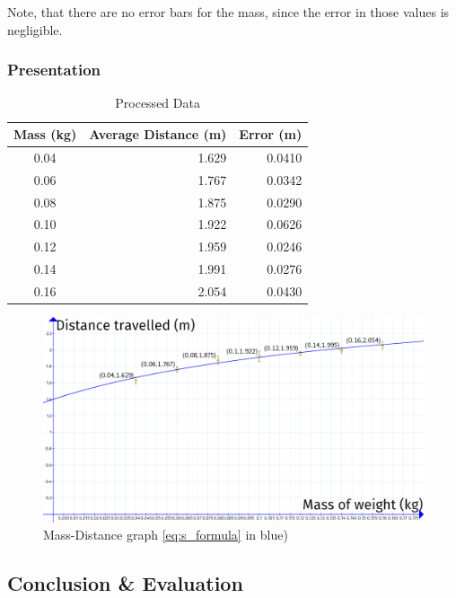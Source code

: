 \documentclass[titlepage,12pt]{article}
\let\oldsubsection\subsection
\renewcommand\subsection{\FloatBarrier \oldsubsection}
\begin{document}
Note, that there are no error bars for the mass, since the error in those values is
negligible.

\subsubsection{Presentation}

\begin{table}[H]
    \centering
    \def\arraystretch{1.5}
    \begin{tabular}{c||r|r}
        Mass (kg) & Average Distance (m) & Error (m)\\ 
        \hline
        \hline
        0.04 & 1.629 & 0.0410\\ 
        \hline
        0.06 & 1.767 & 0.0342\\ 
        \hline
        0.08 & 1.875 & 0.0290\\ 
        \hline
        0.10 & 1.922 & 0.0626\\ 
        \hline
        0.12 & 1.959 & 0.0246\\ 
        \hline
        0.14 & 1.991 & 0.0276\\ 
        \hline
        0.16 & 2.054 & 0.0430\\ 
    \end{tabular}
    \caption{Processed Data} 
    \label{table:processed data}
\end{table}

\begin{figure}[H]
    \centering
    \includegraphics[scale=0.28]{mass-distance_graph}
    \caption{Mass-Distance graph \autoref{eq:s_formula} in blue)}
    \label{fig:mass-distance-graph}
\end{figure}


\subsection{Conclusion \& Evaluation}
\end{document}
